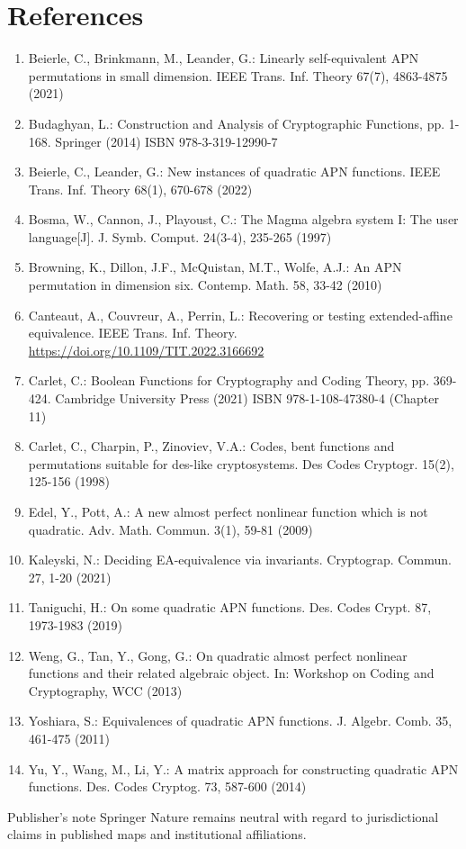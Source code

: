 \documentclass[10pt]{article}
\begin{document}
\section*{References}
\begin{enumerate}
  \item Beierle, C., Brinkmann, M., Leander, G.: Linearly self-equivalent APN permutations in small dimension. IEEE Trans. Inf. Theory 67(7), 4863-4875 (2021)
  \item Budaghyan, L.: Construction and Analysis of Cryptographic Functions, pp. 1-168. Springer (2014) ISBN 978-3-319-12990-7
  \item Beierle, C., Leander, G.: New instances of quadratic APN functions. IEEE Trans. Inf. Theory 68(1), 670-678 (2022)
  \item Bosma, W., Cannon, J., Playoust, C.: The Magma algebra system I: The user language[J]. J. Symb. Comput. 24(3-4), 235-265 (1997)
  \item Browning, K., Dillon, J.F., McQuistan, M.T., Wolfe, A.J.: An APN permutation in dimension six. Contemp. Math. 58, 33-42 (2010)
  \item Canteaut, A., Couvreur, A., Perrin, L.: Recovering or testing extended-affine equivalence. IEEE Trans. Inf. Theory. \href{https://doi.org/10.1109/TIT.2022.3166692}{https://doi.org/10.1109/TIT.2022.3166692}
  \item Carlet, C.: Boolean Functions for Cryptography and Coding Theory, pp. 369-424. Cambridge University Press (2021) ISBN 978-1-108-47380-4 (Chapter 11)
  \item Carlet, C., Charpin, P., Zinoviev, V.A.: Codes, bent functions and permutations suitable for des-like cryptosystems. Des Codes Cryptogr. 15(2), 125-156 (1998)
  \item Edel, Y., Pott, A.: A new almost perfect nonlinear function which is not quadratic. Adv. Math. Commun. 3(1), 59-81 (2009)
  \item Kaleyski, N.: Deciding EA-equivalence via invariants. Cryptograp. Commun. 27, 1-20 (2021)
  \item Taniguchi, H.: On some quadratic APN functions. Des. Codes Crypt. 87, 1973-1983 (2019)
  \item Weng, G., Tan, Y., Gong, G.: On quadratic almost perfect nonlinear functions and their related algebraic object. In: Workshop on Coding and Cryptography, WCC (2013)
  \item Yoshiara, S.: Equivalences of quadratic APN functions. J. Algebr. Comb. 35, 461-475 (2011)
  \item Yu, Y., Wang, M., Li, Y.: A matrix approach for constructing quadratic APN functions. Des. Codes Cryptog. 73, 587-600 (2014)
\end{enumerate}

Publisher's note Springer Nature remains neutral with regard to jurisdictional claims in published maps and institutional affiliations.
\end{document}

